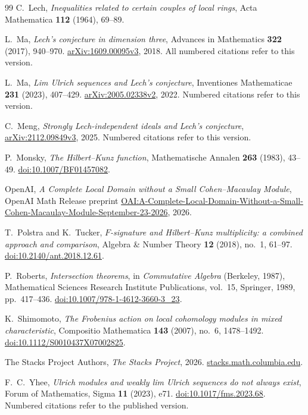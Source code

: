 \begin{thebibliography}{99}
C.~Lech,
\emph{Inequalities related to certain couples of local rings},
Acta Mathematica \textbf{112} (1964), 69--89.

L.~Ma,
\emph{Lech's conjecture in dimension three},
Advances in Mathematics \textbf{322} (2017), 940--970.
\href{https://arxiv.org/abs/1609.00095v3}{arXiv:1609.00095v3}, 2018.
All numbered citations refer to this version.

L.~Ma,
\emph{Lim Ulrich sequences and Lech's conjecture},
Inventiones Mathematicae \textbf{231} (2023), 407--429.
\href{https://arxiv.org/abs/2005.02338v2}{arXiv:2005.02338v2}, 2022.
Numbered citations refer to this version.

C.~Meng,
\emph{Strongly Lech-independent ideals and Lech's conjecture},
\href{https://arxiv.org/abs/2112.09849v3}{arXiv:2112.09849v3}, 2025.
Numbered citations refer to this version.

P.~Monsky,
\emph{The Hilbert--Kunz function},
Mathematische Annalen \textbf{263} (1983), 43--49.
\href{https://doi.org/10.1007/BF01457082}{doi:10.1007/BF01457082}.

OpenAI,
\emph{A Complete Local Domain without a Small Cohen--Macaulay Module},
OpenAI Math Release preprint
\href{https://github.com/openai/math/blob/main/preprints/A-Complete-Local-Domain-Without-a-Small-Cohen-Macaulay-Module-September-23-2026/paper.pdf}{OAI:A-Complete-Local-Domain-Without-a-Small-Cohen-Macaulay-Module-September-23-2026},
2026.

T.~Polstra and K.~Tucker,
\emph{$F$-signature and Hilbert--Kunz multiplicity:
a combined approach and comparison},
Algebra \& Number Theory \textbf{12} (2018), no.~1, 61--97.
\href{https://doi.org/10.2140/ant.2018.12.61}{doi:10.2140/ant.2018.12.61}.

P.~Roberts,
\emph{Intersection theorems},
in \emph{Commutative Algebra} (Berkeley, 1987),
Mathematical Sciences Research Institute Publications, vol.~15,
Springer, 1989, pp.~417--436.
\href{https://doi.org/10.1007/978-1-4612-3660-3_23}{doi:10.1007/978-1-4612-3660-3\_23}.

K.~Shimomoto,
\emph{The Frobenius action on local cohomology modules in mixed
characteristic},
Compositio Mathematica \textbf{143} (2007), no.~6, 1478--1492.
\href{https://doi.org/10.1112/S0010437X07002825}{doi:10.1112/S0010437X07002825}.

The Stacks Project Authors,
\emph{The Stacks Project}, 2026.
\href{https://stacks.math.columbia.edu}{stacks.math.columbia.edu}.

F.~C.~Yhee,
\emph{Ulrich modules and weakly lim Ulrich sequences do not always exist},
Forum of Mathematics, Sigma \textbf{11} (2023), e71.
\href{https://doi.org/10.1017/fms.2023.68}{doi:10.1017/fms.2023.68}.
Numbered citations refer to the published version.

\end{thebibliography}
